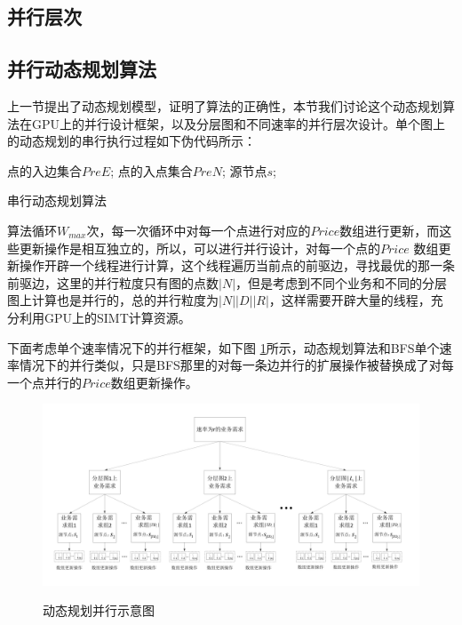 \subsection{并行层次}
\subsection{并行动态规划算法}

上一节提出了动态规划模型，证明了算法的正确性，本节我们讨论这个动态规划算法在GPU上的并行设计框架，以及分层图和不同速率的并行层次设计。单个图上的动态规划的串行执行过程如下伪代码所示：
\begin{algorithm}[t]
\begin{algorithmic}[1]
\Require
点的入边集合$PreE$;
点的入点集合$PreN$;
源节点$s$;
\EndFor
\EndFor
\end{algorithmic}
\caption{{串行动态规划算法}}
\label{pda}
\end{algorithm}

算法循环$W_{max}$次，每一次循环中对每一个点进行对应的$Price$数组进行更新，而这些更新操作是相互独立的，所以，可以进行并行设计，对每一个点的$Price$ 数组更新操作开辟一个线程进行计算，这个线程遍历当前点的前驱边，寻找最优的那一条前驱边，这里的并行粒度只有图的点数$|N|$，但是考虑到不同个业务和不同的分层图上计算也是并行的，总的并行粒度为$|N||D||R|$，这样需要开辟大量的线程，充分利用GPU上的SIMT计算资源。

下面考虑单个速率情况下的并行框架，如下图 \ref{DRK}所示，动态规划算法和BFS单个速率情况下的并行类似，只是BFS那里的对每一条边并行的扩展操作被替换成了对每一个点并行的$Price$数组更新操作。
\begin{figure}
\setlength{\belowcaptionskip}{-0.5cm}
\begin{center}
{\includegraphics[width=1 \textwidth]{figures/DRK.pdf}}
\end{center}
\caption{{\footnotesize{动态规划并行示意图}}}
\label{DRK}
\end{figure}


